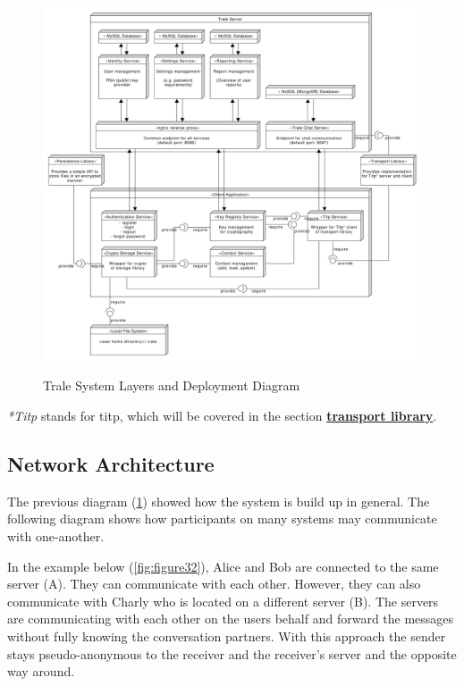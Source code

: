 \begin{figure}[H]
    \centering
    \caption{Trale System Layers and Deployment Diagram}
    \hspace*{-2.9cm}
    \includegraphics[width=1.3\textwidth]{./graphics/systemLayers}
    \label{fig:figure33}
\end{figure}
\textit{*Titp} stands for \ac{titp}, which will be covered in the section
\hyperref[subsec:transport]{\textbf{transport library}}.

\subsection{Network Architecture}\label{subsec:network-architecture}

The previous diagram (\ref{fig:figure33}) showed how the system is build up in general.
The following diagram shows how participants on many systems may communicate with one-another.

In the example below (\ref{fig:figure32}), Alice and Bob are connected to the same server (A).
They can communicate with each other.
However, they can also communicate with Charly who is located on a different server (B).
The servers are communicating with each other on the users behalf and forward the messages without fully knowing
the conversation partners.
With this approach the sender stays pseudo-anonymous to the receiver and the receiver's server and the opposite way
around.

